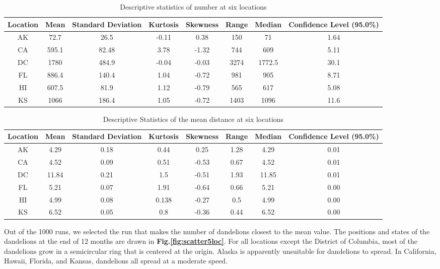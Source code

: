 \documentclass[12pt]{article}
\begin{document}
			{
				\fontsize{10}{14}\selectfont
				{
					\begin{longtable}{cccccccc}
						\caption{Descriptive statistics of number at six locations}
						\label{tb:numDistribution}\\
						\toprule
						Location&Mean&Standard Deviation&Kurtosis&Skewness&Range&Median&Confidence Level (95.0\%)\\
						\toprule
						AK&72.7&26.5&-0.11&0.38&150&71&1.64\\
						CA&595.1&82.48&3.78&-1.32&744&609&5.11\\
						DC&1780&484.9&-0.04&-0.03&3274&1772.5&30.1\\
						FL&886.4&140.4&1.04&-0.72&981&905&8.71\\
						HI&607.5&81.9&1.12&-0.79&565&617&5.08\\
						KS&1066&186.4&1.05&-0.72&1403&1096&11.6\\
						\bottomrule
					\end{longtable}
				}
			}
			
			{
				\fontsize{10}{14}\selectfont
				{
					\begin{longtable}{cccccccc}
						\caption{Descriptive Statistics of the mean distance at six locations}
						\label{tb:distDistribution}\\
						\toprule
						Location&Mean&Standard Deviation&Kurtosis&Skewness&Range&Median&Confidence Level (95.0\%)\\
						\toprule
						AK&4.29&0.18&0.44&0.25&1.28&4.29&0.01\\
						CA&4.52&0.09&0.51&-0.53&0.67&4.52&0.01\\
						DC&11.84&0.21&1.5&-0.51&1.93&11.85&0.01\\
						FL&5.21&0.07&1.91&-0.64&0.66&5.21&0.00\\
						HI&4.99&0.08&0.138&-0.27&0.5&4.99&0.00\\
						KS&6.52&0.05&0.8&-0.36&0.44&6.52&0.00\\
						\bottomrule
					\end{longtable}
				}
			}
			
			Out of the 1000 runs, we selected the run that makes the number of dandelions closest to the mean value.  The positions and states of the dandelions at the end of 12 months are drawn in \textbf{Fig.\ref{fig:scatter5loc}}.  For all locations except the District of Columbia, most of the dandelions grow in a semicircular ring that is centered at the origin.  Alaska is apparently unsuitable for dandelions to spread.  In California, Hawaii, Florida, and Kansas, dandelions all spread at a moderate speed.
			
\end{document}
